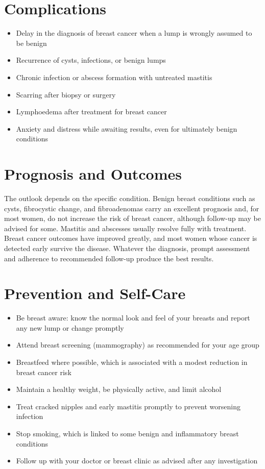 \section*{Complications}
\begin{itemize}
    \item Delay in the diagnosis of breast cancer when a lump is wrongly assumed to be benign
    \item Recurrence of cysts, infections, or benign lumps
    \item Chronic infection or abscess formation with untreated mastitis
    \item Scarring after biopsy or surgery
    \item Lymphoedema after treatment for breast cancer
    \item Anxiety and distress while awaiting results, even for ultimately benign conditions
\end{itemize}

\section*{Prognosis and Outcomes}
The outlook depends on the specific condition. Benign breast conditions such as cysts, fibrocystic change, and fibroadenomas carry an excellent prognosis and, for most women, do not increase the risk of breast cancer, although follow-up may be advised for some. Mastitis and abscesses usually resolve fully with treatment. Breast cancer outcomes have improved greatly, and most women whose cancer is detected early survive the disease. Whatever the diagnosis, prompt assessment and adherence to recommended follow-up produce the best results.

\section*{Prevention and Self-Care}
\begin{itemize}
    \item Be breast aware: know the normal look and feel of your breasts and report any new lump or change promptly
    \item Attend breast screening (mammography) as recommended for your age group
    \item Breastfeed where possible, which is associated with a modest reduction in breast cancer risk
    \item Maintain a healthy weight, be physically active, and limit alcohol
    \item Treat cracked nipples and early mastitis promptly to prevent worsening infection
    \item Stop smoking, which is linked to some benign and inflammatory breast conditions
    \item Follow up with your doctor or breast clinic as advised after any investigation
\end{itemize}

